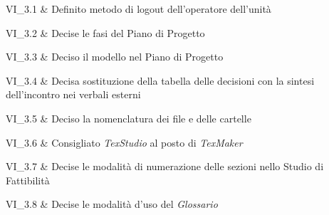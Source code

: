 VI\_3.1 & Definito metodo di logout dell'operatore dell'unità

\tabularnewline
VI\_3.2 & Decise le fasi del Piano di Progetto

\tabularnewline
VI\_3.3 & Deciso il modello nel Piano di Progetto

\tabularnewline
VI\_3.4 & Decisa sostituzione della tabella delle decisioni con la sintesi dell'incontro nei verbali esterni

\tabularnewline
VI\_3.5 & Deciso la nomenclatura dei file e delle cartelle

\tabularnewline
VI\_3.6 & Consigliato \textit{TexStudio} al posto di \textit{TexMaker}

\tabularnewline
VI\_3.7 & Decise le modalità di numerazione delle sezioni nello Studio di Fattibilità

\tabularnewline
VI\_3.8 & Decise le modalità d'uso del \textit{Glossario}